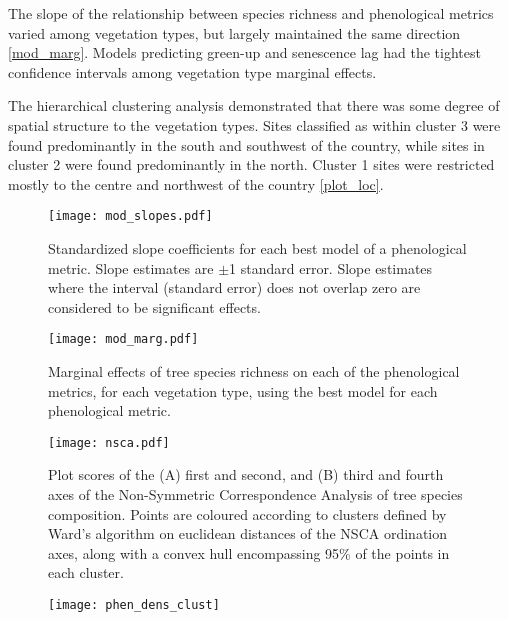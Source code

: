 \documentclass[11pt,a4paper]{article}
\begin{document}
The slope of the relationship between species richness and phenological metrics varied among vegetation types, but largely maintained the same direction \autoref{mod_marg}. Models predicting green-up and senescence lag had the tightest confidence intervals among vegetation type marginal effects.

The hierarchical clustering analysis demonstrated that there was some degree of spatial structure to the vegetation types. Sites classified as within cluster 3 were found predominantly in the south and southwest of the country, while sites in cluster 2 were found predominantly in the north. Cluster 1 sites were restricted mostly to the centre and northwest of the country \autoref{plot_loc}.



 

\begin{figure}[H]
\centering
	\texttt{[image: mod\_slopes.pdf]}
	\caption{Standardized slope coefficients for each best model of a phenological metric. Slope estimates are $\pm$1 standard error. Slope estimates where the interval (standard error) does not overlap zero are considered to be significant effects.}
	\label{mod_slopes}
\end{figure}

\begin{figure}[H]
\centering
	\texttt{[image: mod\_marg.pdf]}
	\caption{Marginal effects of tree species richness on each of the phenological metrics, for each vegetation type, using the best model for each phenological metric.}
	\label{mod_marg}
\end{figure}

\begin{figure}[H]
\centering
	\texttt{[image: nsca.pdf]}
	\caption{Plot scores of the (A) first and second, and (B) third and fourth axes of the Non-Symmetric Correspondence Analysis of tree species composition. Points are coloured according to clusters defined by Ward's algorithm on euclidean distances of the NSCA ordination axes, along with a convex hull encompassing 95\% of the points in each cluster.}
	\label{nsca}
\end{figure}

\begin{figure}[H]
\centering
	\texttt{[image: phen\_dens\_clust]}
	\caption{}
	\label{phen_dens_clust}
\end{figure}
\end{document}
